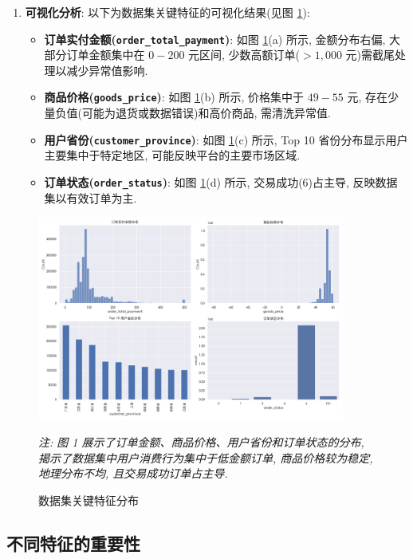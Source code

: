 \documentclass[11pt, a4paper]{article}
\begin{document}
\begin{enumerate}
    \item \textbf{可视化分析}:
    以下为数据集关键特征的可视化结果(见图 \ref{fig:overall_analysis}):
    \begin{itemize}
        \item \textbf{订单实付金额(\texttt{order\_total\_payment})}: 如图 \ref{fig:overall_analysis}(a) 所示, 金额分布右偏, 大部分订单金额集中在 $0-200$ 元区间, 少数高额订单($>1,000$ 元)需截尾处理以减少异常值影响.
        \item \textbf{商品价格(\texttt{goods\_price})}: 如图 \ref{fig:overall_analysis}(b) 所示, 价格集中于 $49-55$ 元, 存在少量负值(可能为退货或数据错误)和高价商品, 需清洗异常值.
        \item \textbf{用户省份(\texttt{customer\_province})}: 如图 \ref{fig:overall_analysis}(c) 所示, Top 10 省份分布显示用户主要集中于特定地区, 可能反映平台的主要市场区域.
        \item \textbf{订单状态(\texttt{order\_status})}: 如图 \ref{fig:overall_analysis}(d) 所示, 交易成功(6)占主导, 反映数据集以有效订单为主.
    \end{itemize}
\end{enumerate}

\begin{figure}[H]
    \centering
    \includegraphics[width=0.9\textwidth]{../analysis/overall_analysis.png}
    \caption{数据集关键特征分布}
    \label{fig:overall_analysis}
    \vspace{1em} %
    \small
    \textit{注: 图 1 展示了订单金额、商品价格、用户省份和订单状态的分布, 揭示了数据集中用户消费行为集中于低金额订单, 商品价格较为稳定, 地理分布不均, 且交易成功订单占主导.}
\end{figure}

\subsection{不同特征的重要性}
\end{document}
